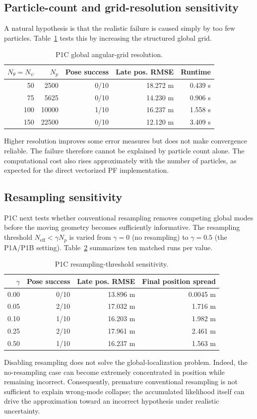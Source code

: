 \subsection{Particle-count and grid-resolution sensitivity}
A natural hypothesis is that the realistic failure is caused simply by too few particles. Table~\ref{tab:p1c_grid} tests this by increasing the structured global grid.
\begin{table}[ht]
\centering
\caption{P1C global angular-grid resolution.}
\label{tab:p1c_grid}
\begin{tabular}{rrrrr}
\toprule
$N_{\theta}=N_{\psi}$ & $N_p$ & Pose success & Late pos. RMSE & Runtime\\
\midrule
50 & 2500 & 0/10 & 18.272 m & 0.439 s\\
75 & 5625 & 0/10 & 14.230 m & 0.906 s\\
100 & 10000 & 1/10 & 16.237 m & 1.558 s\\
150 & 22500 & 0/10 & 12.120 m & 3.409 s\\
\bottomrule
\end{tabular}
\end{table}
Higher resolution improves some error measures but does not make convergence reliable. The failure therefore cannot be explained by particle count alone. The computational cost also rises approximately with the number of particles, as expected for the direct vectorized PF implementation.

\subsection{Resampling sensitivity}
P1C next tests whether conventional resampling removes competing global modes before the moving geometry becomes sufficiently informative. The resampling threshold $N_{\mathrm{eff}}<\gamma N_p$ is varied from $\gamma=0$ (no resampling) to $\gamma=0.5$ (the P1A/P1B setting). Table~\ref{tab:p1c_resampling} summarizes ten matched runs per value.
\begin{table}[ht]
\centering
\caption{P1C resampling-threshold sensitivity.}
\label{tab:p1c_resampling}
\begin{tabular}{rrrr}
\toprule
$\gamma$ & Pose success & Late pos. RMSE & Final position spread\\
\midrule
0.00 & 0/10 & 13.896 m & 0.0045 m\\
0.05 & 2/10 & 17.032 m & 1.716 m\\
0.10 & 1/10 & 16.203 m & 1.982 m\\
0.25 & 2/10 & 17.961 m & 2.461 m\\
0.50 & 1/10 & 16.237 m & 1.563 m\\
\bottomrule
\end{tabular}
\end{table}
Disabling resampling does not solve the global-localization problem. Indeed, the no-resampling case can become extremely concentrated in position while remaining incorrect. Consequently, premature conventional resampling is not sufficient to explain wrong-mode collapse; the accumulated likelihood itself can drive the approximation toward an incorrect hypothesis under realistic uncertainty.

